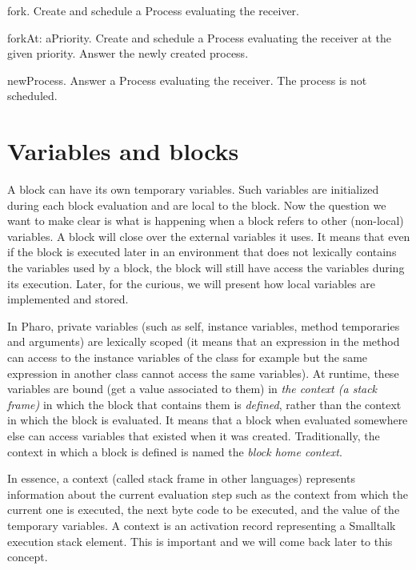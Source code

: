 \documentclass[a4paper,10pt,twoside]{book}
\begin{document}
\begin{description}
\item{\textsf{fork}}. Create and schedule a Process evaluating the receiver.

\item{\textsf{forkAt: aPriority}}. Create and schedule a Process evaluating the receiver at the given priority. Answer the newly created process.

\item{\textsf{newProcess}}. Answer a Process evaluating the receiver. The process is not scheduled.
\end{description}


\section{Variables and blocks}
A block can have its own temporary variables. Such variables are initialized during each block evaluation and are local to the block. Now the question we want to make clear is what is happening when a block refers to other (non-local) variables. A block will close over the external variables it uses. It means that even if the block is executed later in an environment that does not lexically contains the variables used by a block, the block will still have access the variables during its execution. Later, for the curious, we will present how local variables are implemented and stored.

In Pharo, private variables (such as self, instance variables, method temporaries and arguments) are lexically scoped (it means that an expression in the method can access to the instance variables of the class for example but the same expression in another class cannot access the same variables). At runtime, these variables are bound (get a value associated to them) in \emph{the context (a stack frame)} in which the block that contains them is \emph{defined}, rather than the context in which the block is evaluated. It means that a block when evaluated somewhere else can access variables that existed when it was created. Traditionally, the context in which a block is defined is named the \emph{block home context}.

In essence, a context (called stack frame in other languages) represents information about the current evaluation step such as the context from which the current one is executed, the next byte code to be executed, and the value of the temporary variables. A context is an activation record representing a Smalltalk execution stack element. This is important and we will come back later to this concept.
\end{document}
